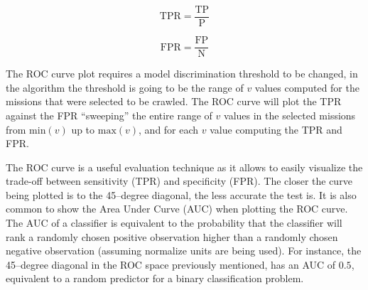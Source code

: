 \begin{equation} \label{eq:tpr}
    \text{TPR} = \dfrac{\text{TP}}{\text{P}}
\end{equation}

\begin{equation} \label{eq:fpr}
    \text{FPR} = \dfrac{\text{FP}}{\text{N}}
\end{equation}

The ROC curve plot requires a model discrimination threshold to be changed, in the \mlblink algorithm the threshold is going to be the range of $v$ values computed for the missions that were selected to be crawled. The ROC curve will plot the TPR against the FPR ``sweeping'' the entire range of $v$ values in the selected missions from $\text{min}(v)$ up to $\text{max}(v)$, and for each $v$ value computing the TPR and FPR. \newline

The ROC curve is a useful evaluation technique as it allows to easily visualize the trade-off between sensitivity (TPR) and specificity (FPR). The closer the curve being plotted is to the 45--degree diagonal, the less accurate the test is. It is also common to show the Area Under Curve (AUC) when plotting the ROC curve. The AUC of a classifier is equivalent to the probability that the classifier will rank a randomly chosen positive observation higher than a randomly chosen negative observation \cite{article:roc-analysis} (assuming normalize units are being used). For instance, the 45--degree diagonal in the ROC space previously mentioned, has an AUC of $0.5$, equivalent to a random predictor for a binary classification problem.